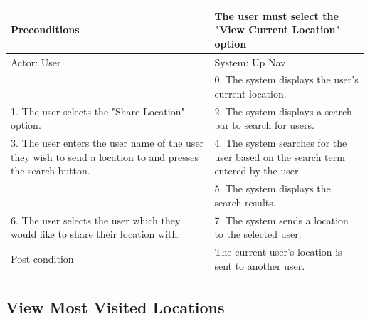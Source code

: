 \documentclass{article}
\begin{document}
\begin{enumerate}
	\begin{tabular}{ | m{15em} | m{15em}| }
		\hline
		Preconditions                                                                                                						& The user must select the "View Current Location" option \\ 
		\hline
		Actor: User                                                                                                						 	& System: Up Nav \\ 
		\hline
                                                                                                            									& 0. The system displays the user's current location. \\ 
		\hline
		1. The user selects the "Share Location" option.                                                            					& 2. The system displays a search bar to search for users. \\
		\hline
		3. The user enters the user name of the user they wish to send a location to and presses the search button. 	& 4. The system searches for the user based on the search term entered by the user. \\ 
		\hline
                                                                                                            									& 5. The system displays the search results. \\ 
		\hline
		6. The user selects the user which they would like to share their location with.                            			& 7. The system sends a location to the selected user. \\ 
		\hline
		Post condition                                                                                               						& The current user's location is sent to another user. \\ 
		\hline

	\end{tabular}


	\subsection{View Most Visited Locations}

	\centering


\end{enumerate}
\end{document}
